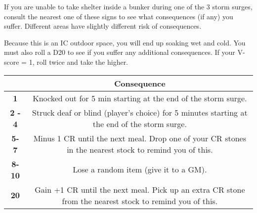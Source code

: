 \documentclass[green]{GL2020}
\begin{document}
\name{\gStormSurgeOutside{}}

If you are unable to take shelter inside a bunker during one of the 3 storm surges, consult the nearest one of these signs to see what consequences (if any) you suffer. Different areas have slightly different risk of consequences.

Because this is an IC outdoor space, you will end up soaking wet and cold. You must also roll a D20 to see if you suffer any additional consequences. If your V-score = 1, roll twice and take the higher.

\begin{tabularx}{\textwidth}{|>{\centering\arraybackslash}c | >{\centering\arraybackslash}c |}
\hline
  {\large What you Roll} & {\large Consequence}  \\
\hline
 \textbf{1} & Knocked out for 5 min starting at the end of the storm surge.  \\
\hline
  \textbf{2 - 4} & Struck deaf or blind (player’s choice) for 5 minutes starting at the end of the storm surge.  \\
\hline
  \textbf{5- 7} & Minus 1 CR until the next meal. Drop one of your CR stones in the nearest stock to remind you of this.  \\
\hline
  \textbf{8- 10} & Lose a random item (give it to a GM).  \\
\hline
 \textbf{20} & Gain +1 CR until the next meal. Pick up an extra CR stone from the nearest stock to remind you of this.  \\
\hline
\end{tabularx}
\end{document}
